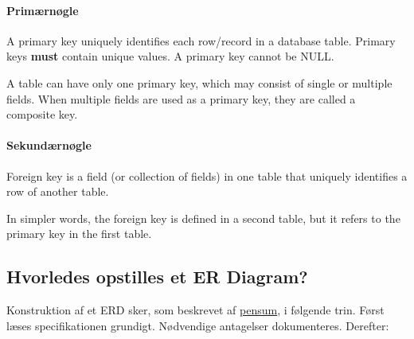 \paragraph{Primærnøgle}
A primary key uniquely identifies each row/record in a database table. Primary keys \textbf{must} contain unique values. A primary key cannot be NULL.

A table can have only one primary key, which may consist of single or multiple fields. When multiple fields are used as a primary key, they are called a composite key.

\paragraph{Sekundærnøgle}
Foreign key is a field (or collection of fields) in one table that uniquely identifies a row of another table. 

In simpler words, the foreign key is defined in a second table, but it refers to the primary key in the first table.

\subsection{Hvorledes opstilles et ER Diagram?}
Konstruktion af et ERD sker, som beskrevet af \href{http://db.grussell.org/section004.html#_Toc67114397}{pensum}, i følgende trin. Først læses specifikationen grundigt. Nødvendige antagelser dokumenteres. Derefter:

